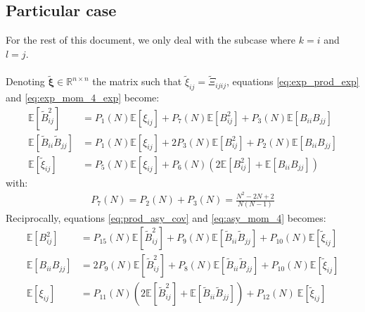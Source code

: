 \documentclass[12pt]{scrartcl}
\begin{document}
\subsection{Particular case}
For the rest of this document, we only deal with the subcase where $k=i$ and $l=j$.\\
$ $\\
Denoting $\widetilde{\boldsymbol{\xi}} \in \mathbb{R}^{n \times n}$ the matrix such that $\widetilde{\xi}_{ij} = \widetilde{\Xi}_{ijij}$, equations \eqref{eq:exp_prod_exp} and \eqref{eq:exp_mom_4_exp} become:
\begin{subequations}
\begin{align}
\label{eq:exp_prod_exp_2}
\mathbb{E} \left[\widetilde{B}_{ij}^2\right] & = P_1(N) \mathbb{E} \left[\xi_{ij}\right] + P_7(N) \mathbb{E} \left[B^2_{ij}\right] + P_3(N) \mathbb{E} \left[B_{ii} B_{jj}\right] \\
\label{eq:exp_prod_exp_3}
\mathbb{E} \left[\widetilde{B}_{ii} \widetilde{B}_{jj}\right] & = P_1(N) \mathbb{E} \left[\xi_{ij}\right] + 2 P_3(N) \mathbb{E} \left[B^2_{ij}\right] + P_2(N) \mathbb{E} \left[B_{ii} B_{jj}\right] \\
\label{eq:exp_mom_4_exp_2}
\mathbb{E} \left[\widetilde{\xi}_{ij}\right] & = P_5(N) \mathbb{E} \left[\xi_{ij} \right] + P_6(N) \left(2 \mathbb{E} \left[B^2_{ij}\right] + \mathbb{E} \left[B_{ii} B_{jj}\right] \right)
\end{align}
\end{subequations}
with:
\begin{align}
P_7(N) = P_2(N) + P_3(N) =  \frac{N^2-2N+2}{N(N-1)}
\end{align}
Reciprocally, equations \eqref{eq:prod_asy_cov} and \eqref{eq:asy_mom_4} becomes:
\begin{subequations}
\begin{align}
\label{eq:prod_asy_cov_exp_2}
\mathbb{E} \left[B^2_{ij}\right] & = P_{15}(N) \mathbb{E} \left[\widetilde{B}^2_{ij}\right] + P_9(N) \mathbb{E} \left[\widetilde{B}_{ii} \widetilde{B}_{jj}\right] + P_{10}(N) \mathbb{E} \left[\widetilde{\xi}_{ij}\right] \\
\label{eq:prod_asy_cov_exp_3}
\mathbb{E} \left[B_{ii} B_{jj}\right] & = 2P_9(N) \mathbb{E} \left[\widetilde{B}^2_{ij}\right] + P_8(N) \mathbb{E} \left[\widetilde{B}_{ii} \widetilde{B}_{jj}\right] + P_{10}(N) \mathbb{E} \left[\widetilde{\xi}_{ij}\right] \\
\label{eq:asy_mom_4_exp_2}
\mathbb{E} \left[\xi_{ij}\right] & = P_{11}(N) \left(2 \mathbb{E} \left[\widetilde{B}_{ij}^2\right] + \mathbb{E} \left[\widetilde{B}_{ii} \widetilde{B}_{jj}\right] \right) + P_{12}(N) \ \mathbb{E} \left[\widetilde{\xi}_{ij}\right]
\end{align}
\end{subequations}
\end{document}
